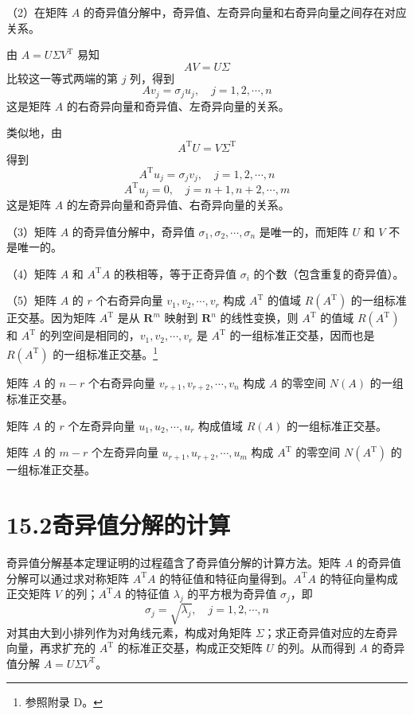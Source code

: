 \documentclass[UTF8, 12pt, fontset=fandol, oneside]{ctexart}
\begin{document}
（2）在矩阵 $A$ 的奇异值分解中，奇异值、左奇异向量和右奇异向量之间存在对应关系。

由 $A=U\Sigma V^{\mathrm{T}}$ 易知
\[
AV=U\Sigma
\]
比较这一等式两端的第 $j$ 列，得到
\begin{equation}
Av_j=\sigma_ju_j,\quad j=1,2,\cdots,n
\tag{15.22}
\end{equation}
这是矩阵 $A$ 的右奇异向量和奇异值、左奇异向量的关系。

类似地，由
\[
A^{\mathrm{T}}U=V\Sigma^{\mathrm{T}}
\]
得到
\begin{equation}
A^{\mathrm{T}}u_j=\sigma_jv_j,\quad j=1,2,\cdots,n
\tag{15.23}
\end{equation}
\begin{equation}
A^{\mathrm{T}}u_j=0,\quad j=n+1,n+2,\cdots,m
\tag{15.24}
\end{equation}
这是矩阵 $A$ 的左奇异向量和奇异值、右奇异向量的关系。

（3）矩阵 $A$ 的奇异值分解中，奇异值 $\sigma_1,\sigma_2,\cdots,\sigma_n$ 是唯一的，而矩阵 $U$ 和 $V$ 不是唯一的。

（4）矩阵 $A$ 和 $A^{\mathrm{T}}A$ 的秩相等，等于正奇异值 $\sigma_i$ 的个数（包含重复的奇异值）。

（5）矩阵 $A$ 的 $r$ 个右奇异向量 $v_1,v_2,\cdots,v_r$ 构成 $A^{\mathrm{T}}$ 的值域 $R(A^{\mathrm{T}})$ 的一组标准正交基。因为矩阵 $A^{\mathrm{T}}$ 是从 $\mathbf{R}^m$ 映射到 $\mathbf{R}^n$ 的线性变换，则 $A^{\mathrm{T}}$ 的值域 $R(A^{\mathrm{T}})$ 和 $A^{\mathrm{T}}$ 的列空间是相同的，$v_1,v_2,\cdots,v_r$ 是 $A^{\mathrm{T}}$ 的一组标准正交基，因而也是 $R(A^{\mathrm{T}})$ 的一组标准正交基。\footnote{参照附录 D。}

矩阵 $A$ 的 $n-r$ 个右奇异向量 $v_{r+1},v_{r+2},\cdots,v_n$ 构成 $A$ 的零空间 $N(A)$ 的一组标准正交基。

矩阵 $A$ 的 $r$ 个左奇异向量 $u_1,u_2,\cdots,u_r$ 构成值域 $R(A)$ 的一组标准正交基。

矩阵 $A$ 的 $m-r$ 个左奇异向量 $u_{r+1},u_{r+2},\cdots,u_m$ 构成 $A^{\mathrm{T}}$ 的零空间 $N(A^{\mathrm{T}})$ 的一组标准正交基。

\section*{15.2\quad 奇异值分解的计算}

奇异值分解基本定理证明的过程蕴含了奇异值分解的计算方法。矩阵 $A$ 的奇异值分解可以通过求对称矩阵 $A^{\mathrm{T}}A$ 的特征值和特征向量得到。$A^{\mathrm{T}}A$ 的特征向量构成正交矩阵 $V$ 的列；$A^{\mathrm{T}}A$ 的特征值 $\lambda_j$ 的平方根为奇异值 $\sigma_j$，即
\[
\sigma_j=\sqrt{\lambda_j},\quad j=1,2,\cdots,n
\]
对其由大到小排列作为对角线元素，构成对角矩阵 $\Sigma$；求正奇异值对应的左奇异向量，再求扩充的 $A^{\mathrm{T}}$ 的标准正交基，构成正交矩阵 $U$ 的列。从而得到 $A$ 的奇异值分解 $A=U\Sigma V^{\mathrm{T}}$。
\end{document}
